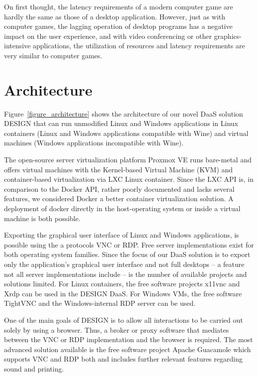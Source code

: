 \documentclass[runningheads]{llncs}
\begin{document}
On first thought, the latency requirements of a modern computer game are hardly the same as those of a desktop application. However, just as with computer games, the lagging operation of desktop programs has a negative impact on the user experience, and with video conferencing or other graphics-intensive applications, the utilization of resources and latency requirements are very similar to computer games.

\section{Architecture}
\label{sec:RecommendDaaSarchitecture}
% 

Figure~\ref{figure_architecture} shows the architecture of our novel DaaS solution DESIGN that can run unmodified Linux and Windows applications in Linux containers (Linux and Windows applications compatible with Wine) and virtual machines (Windows applications incompatible with Wine).

The open-source server virtualization platform Proxmox VE runs bare-metal and offers virtual machines with the Kernel-based Virtual Machine (KVM) and container-based virtualization via LXC Linux container. Since the LXC API is, in comparison to the Docker API, rather poorly documented and lacks several features, we considered Docker a better container virtualization solution. A deployment of docker directly in the host-operating system or inside a virtual machine is both possible.

Exporting the graphical user interface of Linux and Windows applications, is possible using the a protocols VNC or RDP. Free server implementations exist for both operating system families. Since the focus of our DaaS solution is to export only the application's graphical user interface and not full desktops -- a feature not all server implementations include -- is the number of available projects and solutions limited. For Linux containers, the free software projects x11vnc and Xrdp can be used in the DESIGN DaaS. For Windows VMs, the free software TightVNC and the Windows-internal RDP server can be used. 

One of the main goals of DESIGN is to allow all interactions to be carried out solely by using a browser. Thus, a broker or proxy software that mediates between the VNC or RDP implementation and the browser is required. The most advanced solution available is the free software project Apache Guacamole which supports VNC and RDP both and includes further relevant features regarding sound and printing.
\end{document}
